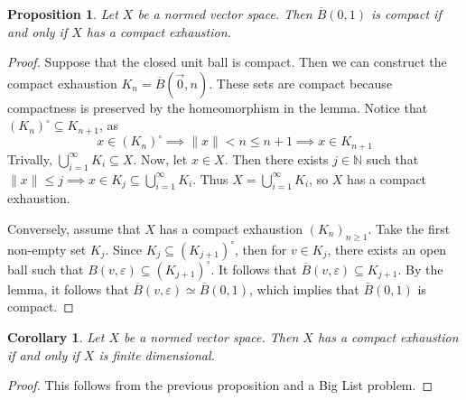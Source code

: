 \documentclass{article}
\newcommand{\cl}[1]{\overline{#1}}
\theoremstyle{plain} %
\numberwithin{thm}{section} %
\newtheorem{prop}[thm]{Proposition}
\newtheorem{cor}[thm]{Corollary}
\theoremstyle{definition}
\begin{document}
    \begin{prop}
        Let \(X\) be a normed vector space. Then \(\cl{B}(0, 1)\) is compact if and only if \(X\) has a compact exhaustion.
    \end{prop}
    \begin{proof}
        Suppose that the closed unit ball is compact. Then we can construct the compact exhaustion \(K_n = \cl{B}(\vec{0}, n)\). These sets are compact because compactness is preserved by the homeomorphism in the lemma. Notice that \((K_n)^\circ \subseteq K_{n+1}\), as
        \[
            x \in (K_n)^\circ \implies \|x\| < n \leq n+1 \implies x \in K_{n+1}
        \]
        Trivally, \(\bigcup_{i=1}^{\infty} K_i \subseteq X\). Now, let \(x \in X\). Then there exists \(j \in \mathbb{N}\) such that \(\|x\| \leq j \implies x \in K_j \subseteq \bigcup_{i=1}^{\infty} K_i\). Thus \(X = \bigcup_{i=1}^{\infty} K_i\), so \(X\) has a compact exhaustion.

        Conversely, assume that \(X\) has a compact exhaustion \((K_n)_{n\geq 1}\). Take the first non-empty set \(K_j\). Since \(K_j \subseteq (K_{j+1})^\circ\), then for \(v \in K_j\), there exists an open ball such that \(B(v, \varepsilon) \subseteq (K_{j+1})^\circ\). It follows that \(\cl{B}(v, \varepsilon) \subseteq K_{j+1}\). By the lemma, it follows that \(\cl{B}(v, \varepsilon) \simeq \cl{B}(0, 1)\), which implies that \(\cl{B}(0,1)\) is compact.
        \smallbreak
    \end{proof}

    \begin{cor}
        Let \(X\) be a normed vector space. Then \(X\) has a compact exhaustion if and only if \(X\) is finite dimensional.
    \end{cor}
    \begin{proof}
        This follows from the previous proposition and a Big List problem.
    \end{proof}
\end{document}
